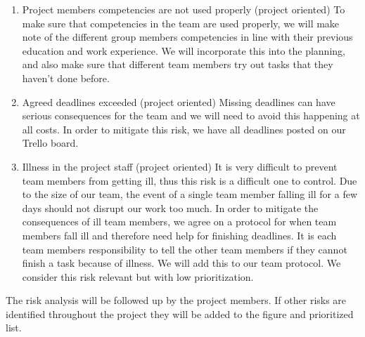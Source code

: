 \begin{enumerate}
    \item Project members competencies are not used properly (project oriented)
    To make sure that competencies in the team are used properly, we will make note of the different group members competencies in line with their previous education and work experience. We will incorporate this into the planning, and also make sure that different team members try out tasks that they haven’t done before.
    \item Agreed deadlines exceeded (project oriented)
    Missing deadlines can have serious consequences for the team and we will need to avoid this happening at all costs. In order to mitigate this risk, we have all deadlines posted on our Trello board.
    \item Illness in the project staff (project oriented)
   It is very difficult to prevent team members from getting ill, thus this risk is a difficult one to control. Due to the size of our team, the event of a single team member falling ill for a few days should not disrupt our work too much. In order to mitigate the consequences of ill team members, we agree on a protocol for when team members fall ill and therefore need help for finishing deadlines. It is each team members responsibility to tell the other team members if they cannot finish a task because of illness. We will add this to our team protocol. We consider this risk relevant but with low prioritization.
\end{enumerate}
\noindent
The risk analysis will be followed up by the project members. If other risks are identified throughout the project they will be added to the figure and prioritized list.
